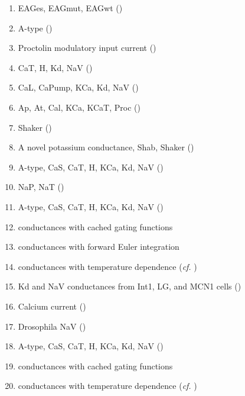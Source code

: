 \documentclass[utf8]{frontiers_suppmat} %
\begin{document}
	\begin{enumerate}
		\item EAGes, EAGmut, EAGwt (\cite{bronkRegulationEagCa22018})
		\item A-type (\cite{brookingsAutomaticParameterEstimation2014})
		\item Proctolin modulatory input current (\cite{caplanManyParameterSets2014})
		\item CaT, H, Kd, NaV (\cite{dethierPositiveFeedbackCellular2015})
		\item CaL, CaPump, KCa, Kd, NaV (\cite{drionDopaminePacemakerNeuron2017})
		\item Ap, At, Cal, KCa, KCaT, Proc (\cite{goldmanGlobalStructureRobustness2001})
		\item Shaker (\cite{hardieNovelPotassiumChannels1991})
		\item A novel potassium conductance, Shab, Shaker (\cite{herasModulationVoltagedependentConductances2018})
		\item A-type, CaS, CaT, H, KCa, Kd, NaV (\cite{kisperskyIncreaseSodiumConductance2012})
		\item NaP, NaT (\cite{linActivityDependentAlternativeSplicing2012})
		\item A-type, CaS, CaT, H, KCa, Kd, NaV (\cite{liuModelNeuronActivityDependent1998})
		\item \cite{liuModelNeuronActivityDependent1998} conductances with cached gating functions
		\item \cite{liuModelNeuronActivityDependent1998} conductances with forward Euler integration
		\item \cite{liuModelNeuronActivityDependent1998} conductances with temperature dependence (\textit{cf.} \cite{caplanManyParameterSets2014})
		\item Kd and NaV conductances from Int1, LG, and MCN1 cells (\cite{nadimFrequencyRegulationSlow1998})
		\item Calcium current (\cite{nadimSynapticDepressionCreates1999})
		\item Drosophila NaV (\cite{odowdVoltageclampAnalysisSodium1988})
		\item A-type, CaS, CaT, H, KCa, Kd, NaV (\cite{prinzAlternativeHandtuningConductancebased2003})
		\item \cite{prinzAlternativeHandtuningConductancebased2003} conductances with cached gating functions
		\item \cite{prinzAlternativeHandtuningConductancebased2003} conductances with temperature dependence (\textit{cf.} \cite{caplanManyParameterSets2014})

\end{enumerate}
\end{document}
